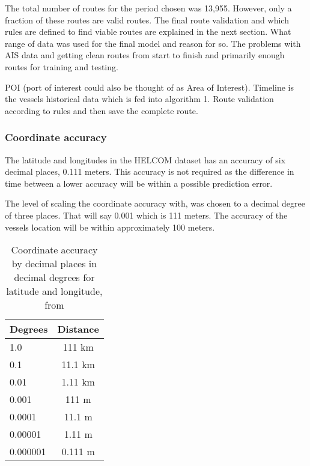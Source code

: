 \documentclass[../main.tex]{subfiles}
\begin{document}
The total number of routes for the period chosen was 13,955. However, only a fraction of these routes are valid routes. The final route validation and which rules are defined to find viable routes are explained in the next section.
What range of data was used for the final model and reason for so. The problems with AIS data and getting clean routes from start to finish and primarily enough routes for training and testing. 

POI (port of interest could also be thought of as Area of Interest). Timeline is the vessels historical data which is fed into algorithm 1. Route validation according to rules and then save the complete route.

\subsubsection{Coordinate accuracy}

The latitude and longitudes in the HELCOM dataset has an accuracy of six decimal places, 0.111 meters. This accuracy is not required as the difference in time between a lower accuracy will be within a possible prediction error.

The level of scaling the coordinate accuracy with, was chosen to a decimal degree of three places. That will say 0.001 which is 111 meters. The accuracy of the vessels location will be within approximately 100 meters.

\begin{table}[H]
\centering
\begin{tabular}{|l|c|}
\hline
\rowcolor[HTML]{C0C0C0} 
\textbf{Degrees} & \multicolumn{1}{l|}{\cellcolor[HTML]{C0C0C0}\textbf{Distance}} \\ \hline
1.0              & 111 km                                                         \\ \hline
0.1              & 11.1 km                                                        \\ \hline
0.01             & 1.11 km                                                        \\ \hline
0.001            & 111 m                                                          \\ \hline
0.0001           & 11.1 m                                                         \\ \hline
0.00001          & 1.11 m                                                         \\ \hline
0.000001          & 0.111 m                                                         \\ \hline
\end{tabular}
\caption{Coordinate accuracy by decimal places in decimal degrees for latitude and longitude, from \cite{GIS_2011}}
\label{tab:gis-accuracy}
\end{table}
\end{document}
